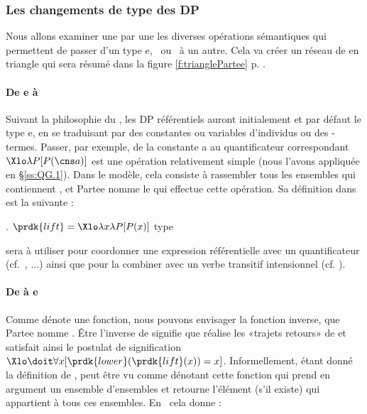 \subsubsection{Les changements de type des DP}

\label{sss:TSDP}

Nous allons examiner une par une les diverses opérations sémantiques qui permettent de passer d'un type \typ e, \et\ ou \ett\ à un autre.  Cela va créer un réseau de  en triangle qui sera résumé dans la figure \ref{f:trianglePartee} p. \pageref{f:trianglePartee}.


\paragraph*{De {e} à }

Suivant la philosophie du , les DP référentiels auront initialement et par défaut le type \typ e, en se traduisant par des constantes ou variables d'individus ou des \atoi-termes. 
Passer, par exemple, de la constante \cns a au quantificateur correspondant $\Xlo\lambda P[P(\cns a)]$ est une opération relativement simple (nous l'avons appliquée en \S\ref{ss:QG.1}).  
Dans le modèle, cela consiste à rassembler tous les ensembles qui contiennent , et Partee nomme  le  qui effectue cette opération.  Sa définition dans {\LO} est la suivante :

\ex.
\(\prdk{lift} = \Xlo\lambda x \lambda P [P(x)]\)
\hfill type 


 sera à utiliser pour coordonner une expression référentielle avec un quantificateur (cf.\ , ...) ainsi que pour la combiner avec un verbe transitif intensionnel (cf. ). 



\paragraph*{De  à e}

\sloppy
Comme  dénote une fonction, nous pouvons envisager la fonction inverse, que Partee nomme .  Être l'inverse de  signifie que  réalise les «trajets retours» de  et satisfait ainsi  le postulat de signification 
\(\Xlo\doit\forall x [\prdk{lower}(\prdk{lift}(x)) = x]\).
Informellement, étant donné la définition de ,  peut être vu comme dénotant cette fonction qui prend en argument un ensemble d'ensembles et retourne l'élément (s'il existe) qui appartient à tous ces ensembles.  En \lterme\ cela donne :

